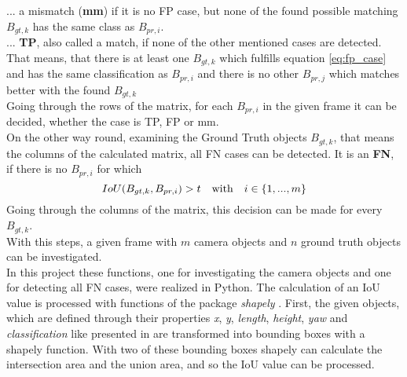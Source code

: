 ... a mismatch (\textbf{mm}) if it is no FP case, but none of the found possible matching $B_{gt,k}$ has the same class as $B_{pr,i}$. \\

... \textbf{TP}, also called a match, if none of the other mentioned cases are detected. That means, that there is at least one $B_{gt,k}$ which fulfills equation \ref{eq:fp_case} and has the same classification as $B_{pr,i}$ and there is no other $B_{pr,j}$ which matches better with the found $B_{gt,k}$ \\

Going through the rows of the matrix, for each $B_{pr,i}$ in the given frame it can be decided, whether the case is TP, FP or mm. \\

On the other way round, examining the Ground Truth objects $B_{gt,k}$, that means the columns of the calculated matrix, all FN cases can be detected. It is an \textbf{FN}, if there is no $B_{pr,i}$ for which
\begin{equation}
IoU(B_{gt,k}, B_{pr,i}) > t \text{\quad with\quad} i \in \left\lbrace 1, ..., m\right\rbrace 
\label{eq:fn_case}
\end{equation}
Going through the columns of the matrix, this decision can be made for every $B_{gt,k}$. \\
With this steps, a given frame with $m$ camera objects and $n$ ground truth objects can be investigated. \\

In this project these functions, one for investigating the camera objects and one for detecting all FN cases, were realized in Python. The calculation of an IoU value is processed with functions of the package \textit{shapely} \cite{Shapely}.
First, the given objects, which are defined through their properties \textit{x}, \textit{y}, \textit{length}, \textit{height}, \textit{yaw} and \textit{classification} like presented in \cite{Aeberhard}
are transformed into bounding boxes with a shapely function. With two of these bounding boxes shapely can calculate the intersection area and the union area, and so the IoU value can be processed. \\

